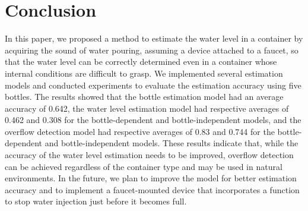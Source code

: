 \documentclass[sigconf]{acmart}
\begin{document}
\section{Conclusion}
\label{sec:conclution}
In this paper, we proposed a method to estimate the water level in a container by acquiring the sound of water pouring, assuming a device attached to a faucet, so that the water level can be correctly determined even in a container whose internal conditions are difficult to grasp. We implemented several estimation models and conducted experiments to evaluate the estimation accuracy using five bottles. The results showed that the bottle estimation model had an average accuracy of 0.642, the water level estimation model had respective averages of 0.462 and 0.308 for the bottle-dependent and bottle-independent models, and the overflow detection model had respective averages of 0.83 and 0.744 for the bottle-dependent and bottle-independent models. These results indicate that, while the accuracy of the water level estimation needs to be improved, overflow detection can be achieved regardless of the container type and may be used in natural environments. In the future, we plan to improve the model for better estimation accuracy and to implement a faucet-mounted device that incorporates a function to stop water injection just before it becomes full.








\end{document}
